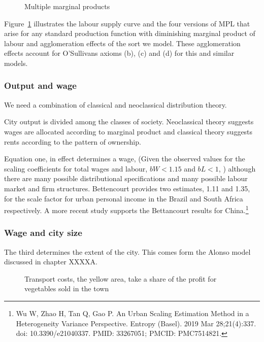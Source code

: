 \begin{figure}[tb]
\begin{center}

\caption{Multiple marginal products}
\label{fig-growth-amenity.tex}
\end{center}
\end{figure}

 Figure~\ref{fig-growth-amenity.tex} illustrates the labour supply curve and the four versions of MPL that arise for any standard production function with diminishing marginal product of labour and agglomeration effects of the sort we model. These agglomeration effects account for O'Sullivans axioms (b), (c) and (d) for this and similar models. 

 
\subsubsection{Output and wage}
We need a combination of classical and neoclassical distribution theory.

City output is divided among the classes of society. Neoclassical theory suggests wages are allocated according to marginal product and classical theory suggests rents according to the pattern of ownership.

Equation one, in effect determines a wage, (Given the observed values for the scaling coefficients for total wages and labour, $bW < 1.15$ and $bL < 1$, )  although there are many possible distributional specifications and many possible labour market and firm structures. Bettencourt provides two  estimates,  1.11 and 1.35, for the scale factor for urban personal income in the Brazil and South Africa respectively. A more recent  study supports the Bettancourt results for China.\footnote{Wu W, Zhao H, Tan Q, Gao P. An Urban Scaling Estimation Method in a Heterogeneity Variance Perspective. Entropy (Basel). 2019 Mar 28;21(4):337. doi: 10.3390/e21040337. PMID: 33267051; PMCID: PMC7514821.} 

\subsubsection{Wage and city size}
The third determines the extent of the city. This comes form the Alonso model discussed in chapter XXXXA. 

\begin{figure}
    \begin{center}
    
    \caption{Transport costs, the yellow area, take a share of the profit for vegetables sold in the town}
    \end{center}
\end{figure}

